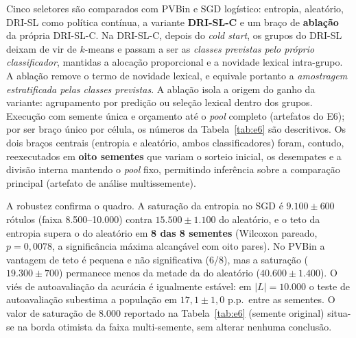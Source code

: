 Cinco seletores são comparados com PVBin e SGD logístico: entropia,
aleatório, DRI-SL como política contínua, a variante \textbf{DRI-SL-C} e um
braço de \textbf{ablação} da própria DRI-SL-C. Na DRI-SL-C, depois do \textit{cold start}, os grupos do DRI-SL deixam de vir
de $k$-means e passam a ser as \emph{classes previstas pelo próprio
classificador}, mantidas a alocação proporcional e a novidade lexical
intra-grupo. A ablação remove o termo de novidade lexical, e equivale portanto
a \emph{amostragem estratificada pelas classes previstas}. A ablação isola a
origem do ganho da variante: agrupamento por predição ou seleção lexical
dentro dos grupos. Execução com semente única e orçamento até o
\textit{pool} completo (artefatos do E6); por
ser braço único por célula, os números da Tabela~\ref{tab:e6} são
descritivos. Os dois braços centrais (entropia e aleatório, ambos
classificadores) foram, contudo, reexecutados em \textbf{oito sementes}
que variam o sorteio inicial, os desempates e a divisão interna mantendo o
\textit{pool} fixo, permitindo inferência sobre a comparação principal
(artefato de análise multissemente).

A robustez confirma o quadro. A saturação
da entropia no SGD é $9.100 \pm 600$ rótulos (faixa 8.500--10.000)
contra $15.500 \pm 1.100$ do aleatório, e o teto da entropia
supera o do aleatório em \textbf{8 das 8 sementes} (Wilcoxon pareado,
$p=0{,}0078$, a significância máxima alcançável com oito pares). No PVBin a vantagem de teto é pequena e não significativa
(6/8), mas a saturação ($19.300 \pm 700$) permanece menos
da metade da do aleatório ($40.600 \pm 1.400$). O viés de
autoavaliação da acurácia é igualmente estável: em $|L|=10.000$ o
teste de autoavaliação subestima a população em $17{,}1\pm1{,}0$ p.p.\ entre as
sementes. O valor de saturação de 8.000 reportado na
Tabela~\ref{tab:e6} (semente original) situa-se na borda otimista da faixa
multi-semente, sem alterar nenhuma conclusão.

